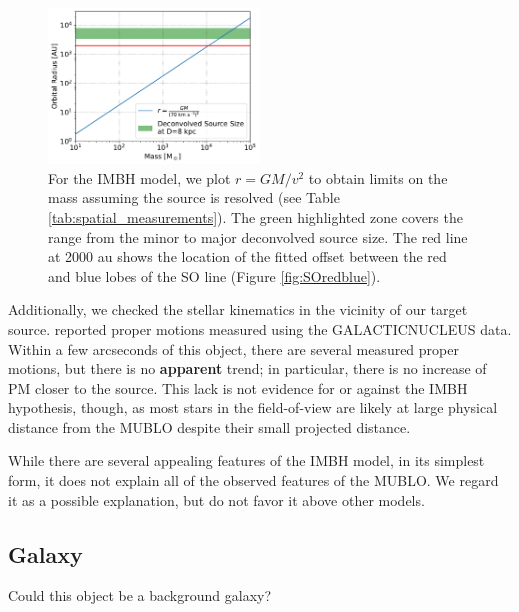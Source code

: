 \documentclass[]{aastex631}
\def\rr#1{\textbf{#1}}
\begin{document}
\begin{figure}
    \centering
    \includegraphics[width=0.5\textwidth]{figures/GMovervsquared.pdf}
    \caption{For the IMBH model, we plot $r=GM/v^2$ to obtain limits on the mass assuming the source is resolved (see Table \ref{tab:spatial_measurements}).  The green highlighted zone covers the range from the minor to major deconvolved source size.
    The red line at 2000 au shows the location of the fitted offset between the red and blue lobes of the SO line (Figure \ref{fig:SOredblue}).
    }
    \label{fig:imbhorbit}
\end{figure}

Additionally, we checked the stellar kinematics in the vicinity of our target source.
\citet{Shahzamanian2022} reported proper motions measured using the GALACTICNUCLEUS data.
Within a few arcseconds of this object, there are several measured proper motions, but there is no \rr{apparent} trend; in particular, there is no increase of PM closer to the source.
This lack is not evidence for or against the IMBH hypothesis, though, as most stars in the field-of-view are likely at large physical distance from the MUBLO despite their small projected distance.


While there are several appealing features of the IMBH model, in its simplest form, it does not explain all of the observed features of the MUBLO.
We regard it as a possible explanation, but do not favor it above other models.

\subsection{Galaxy}
Could this object be a background galaxy?
\end{document}

